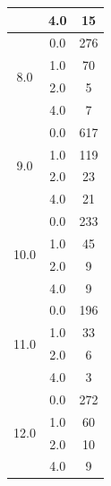 \begin{longtable}{|c|c|c|c|c|}
& \multicolumn{2}{c|}{4.0} & \multicolumn{2}{c|}{15} \\
\hline
\multirow{4}{*}{8.0} & \multicolumn{2}{c|}{0.0} & \multicolumn{2}{c|}{276} \\
& \multicolumn{2}{c|}{1.0} & \multicolumn{2}{c|}{70} \\
& \multicolumn{2}{c|}{2.0} & \multicolumn{2}{c|}{5} \\
& \multicolumn{2}{c|}{4.0} & \multicolumn{2}{c|}{7} \\
\hline
\multirow{4}{*}{9.0} & \multicolumn{2}{c|}{0.0} & \multicolumn{2}{c|}{617} \\
& \multicolumn{2}{c|}{1.0} & \multicolumn{2}{c|}{119} \\
& \multicolumn{2}{c|}{2.0} & \multicolumn{2}{c|}{23} \\
& \multicolumn{2}{c|}{4.0} & \multicolumn{2}{c|}{21} \\
\hline
\multirow{4}{*}{10.0} & \multicolumn{2}{c|}{0.0} & \multicolumn{2}{c|}{233} \\
& \multicolumn{2}{c|}{1.0} & \multicolumn{2}{c|}{45} \\
& \multicolumn{2}{c|}{2.0} & \multicolumn{2}{c|}{9} \\
& \multicolumn{2}{c|}{4.0} & \multicolumn{2}{c|}{9} \\
\hline
\multirow{4}{*}{11.0} & \multicolumn{2}{c|}{0.0} & \multicolumn{2}{c|}{196} \\
& \multicolumn{2}{c|}{1.0} & \multicolumn{2}{c|}{33} \\
& \multicolumn{2}{c|}{2.0} & \multicolumn{2}{c|}{6} \\
& \multicolumn{2}{c|}{4.0} & \multicolumn{2}{c|}{3} \\
\hline
\multirow{4}{*}{12.0} & \multicolumn{2}{c|}{0.0} & \multicolumn{2}{c|}{272} \\
& \multicolumn{2}{c|}{1.0} & \multicolumn{2}{c|}{60} \\
& \multicolumn{2}{c|}{2.0} & \multicolumn{2}{c|}{10} \\
& \multicolumn{2}{c|}{4.0} & \multicolumn{2}{c|}{9} \\
\hline

\end{longtable}
